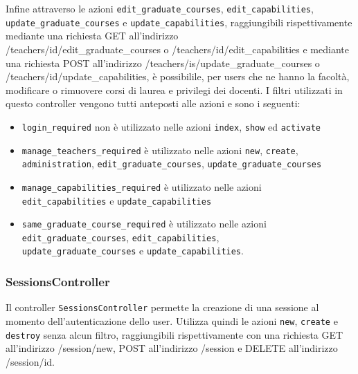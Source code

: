 \documentclass[11pt,a4paper]{article}
\begin{document}
Infine attraverso le azioni \verb|edit_graduate_courses|, \verb|edit_capabilities|, \verb|update_graduate_courses| e \verb|update_capabilities|, raggiungibili rispettivamente mediante una richiesta GET all'indirizzo \\ /teachers/id/edit\_graduate\_courses o /teachers/id/edit\_capabilities e mediante una richiesta POST all'indirizzo /teachers/is/update\_graduate\_courses o /teachers/id/update\_capabilities, è possibilile, per users che ne hanno la facoltà, modificare o rimuovere corsi di laurea e privilegi dei docenti.
I filtri utilizzati in questo controller vengono tutti anteposti alle azioni e sono i seguenti:
\begin{itemize}
 \item \verb|login_required| non è utilizzato nelle azioni \verb|index|, \verb|show| ed \verb|activate|
 \item \verb|manage_teachers_required|  è utilizzato nelle azioni \verb|new|, \verb|create|,\\ \verb|administration|, \verb|edit_graduate_courses|, \verb|update_graduate_courses|
 \item \verb|manage_capabilities_required| è utilizzato nelle azioni \\ \verb|edit_capabilities| e \verb|update_capabilities|
 \item \verb|same_graduate_course_required| è utilizzato nelle azioni \\ \verb|edit_graduate_courses|, \verb|edit_capabilities|,\\ \verb|update_graduate_courses| e \verb|update_capabilities|.
\end{itemize}
\subsubsection{SessionsController}
Il controller \verb|SessionsController| permette la creazione di una sessione al momento dell'autenticazione dello user. Utilizza quindi le azioni \verb|new|, \verb|create| e \verb|destroy| senza alcun filtro, raggiungibili rispettivamente con una richiesta GET all'indirizzo /session/new, POST all'indirizzo /session e DELETE all'indirizzo /session/id.
\end{document}
